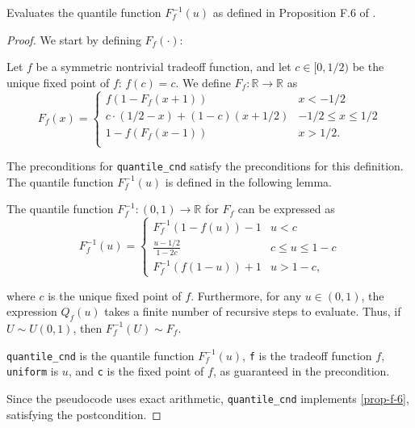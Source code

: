 \documentclass{article}
\begin{document}
\begin{theorem}
    \label{postcondition}
    Evaluates the quantile function $F^{-1}_f(u)$
    as defined in Proposition F.6 of \cite{awan2023canonical}.
\end{theorem}

\begin{proof} 

We start by defining $F_f(\cdot)$:
\begin{definition}
    \label{def1}  %
    Let $f$ be a symmetric nontrivial tradeoff function, and let {$c\in [0,1/2)$} be the unique fixed point of $f$: $f(c)=c$. 
    We define $F_f:\mathbb{R}\rightarrow \mathbb{R}$ as
    \begin{equation}
        F_f(x) = \begin{cases}
            f(1-F_f(x+1))&x<-1/2\\
            c \cdot (1/2-x) + (1-c)(x+1/2)&-1/2\leq x\leq 1/2\\
            1-f(F_f(x-1))&x>1/2.\\
        \end{cases}
    \end{equation}
\end{definition}

The preconditions for \texttt{quantile\_cnd} satisfy the preconditions for this definition.
The quantile function $F^{-1}_f(u)$ is defined in the following lemma.
\begin{proposition}
    \label{prop-f-6}
    The quantile function $F_f^{-1}:(0,1)\rightarrow \mathbb{R}$ for $F_f$ can be expressed as
    \begin{equation}
        F_f^{-1}(u) = \begin{cases}
            F_f^{-1}(1-f(u))-1&u<c\\
            \frac{u-1/2}{1-2c}&c\leq u\leq 1-c\\
            F_f^{-1}(f(1-u))+1&u>1-c,
        \end{cases}
    \end{equation}
    
    where $c$ is the unique fixed point of $f$. 
    {Furthermore, for any $u\in (0,1)$, the expression $Q_f(u)$ takes a finite number of recursive steps to evaluate. Thus,} 
    if $U\sim U(0,1)$, then $F_f^{-1}(U) \sim F_f$. 
\end{proposition}

\texttt{quantile\_cnd} is the quantile function $F^{-1}_f(u)$, 
\texttt{f} is the tradeoff function $f$, 
\texttt{uniform} is $u$,
and \texttt{c} is the fixed point of $f$, as guaranteed in the precondition.

Since the pseudocode uses exact arithmetic, \texttt{quantile\_cnd} implements \ref{prop-f-6},
satisfying the postcondition.

\end{proof}

\printbibliography
\end{document}

